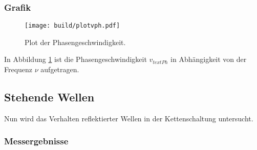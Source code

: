 \subsubsection{Grafik}

\begin{figure}[h]
  \centering
  \texttt{[image: build/plotvph.pdf]}
  \caption{Plot der Phasengeschwindigkeit.}
  \label{fig:vph}
\end{figure}

In Abbildung \ref{fig:vph} ist die Phasengeschwindigkeit $v_{text{Ph}}$ in
Abhängigkeit von der Frequenz
$\nu$ aufgetragen.

\subsection{Stehende Wellen}

Nun wird das Verhalten reflektierter Wellen in der Kettenschaltung
untersucht.

\subsubsection{Messergebnisse}

